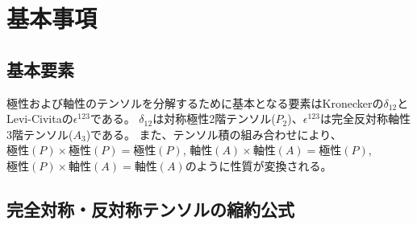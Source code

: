\documentclass[11pt]{easymemo}
\begin{document}

\section{基本事項}

\subsection{基本要素}

極性および軸性のテンソルを分解するために基本となる要素はKroneckerの$\delta_{12}$とLevi-Civitaの$\epsilon^{123}$である。
$\delta_{12}$は対称極性2階テンソル($P_2$)、$\epsilon^{123}$は完全反対称軸性3階テンソル($A_3$)である。
また、テンソル積の組み合わせにより、$極性(P)\times 極性(P)=極性(P)$, $軸性(A)\times 軸性(A)=極性(P)$, $極性(P)\times 軸性(A)=軸性(A)$のように性質が変換される。

\subsection{完全対称・反対称テンソルの縮約公式}
\end{document}
